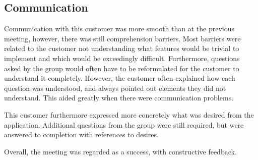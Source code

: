\subsection{Communication}
Communication with this customer was more smooth than at the previous meeting, however, there was still comprehension barriers.
Most barriers were related to the customer not understanding what features would be trivial to implement and which would be exceedingly difficult.
Furthermore, questions asked by the group would often have to be reformulated for the customer to understand it completely.
However, the customer often explained how each question was understood, and always pointed out elements they did not understand.
This aided greatly when there were communication problems.

This customer furthermore expressed more concretely what was desired from the application.
Additional questions from the group were still required, but were answered to completion with references to desires.

Overall, the meeting was regarded as a success, with constructive feedback.
